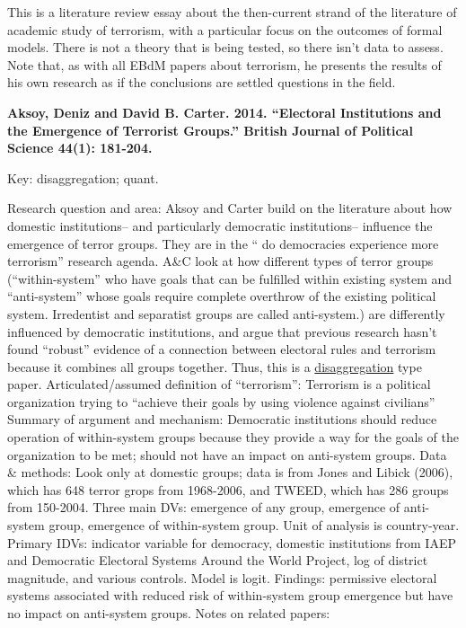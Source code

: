 \documentclass{article}[12pt]
\begin{document}
This is a literature review essay about the then-current strand of the literature of academic study of terrorism, with a particular focus on the outcomes of formal models.  There is not a theory that is being tested, so there isn't data to assess. Note that, as with all EBdM papers about terrorism, he presents the results of his own research as if the conclusions are settled questions in the field.

\textbf{Aksoy, Deniz and David B. Carter. 2014. “Electoral Institutions and the Emergence of Terrorist Groups.” British Journal of Political Science 44(1): 181-204.}

Key: disaggregation; quant.

Research question and area: Aksoy and Carter build on the literature about how domestic institutions-- and particularly democratic institutions-- influence the emergence of terror groups. They are in the `` do democracies experience more terrorism'' research agenda. A\&C look at how different types of terror groups (``within-system'' who have goals that can be fulfilled within existing system and ``anti-system'' whose goals require complete overthrow of the existing political system. Irredentist and separatist groups are called anti-system.) are differently influenced by democratic institutions, and argue that previous research hasn't found ``robust'' evidence of a connection between electoral rules and terrorism because it combines all groups together. Thus, this is a \underline{disaggregation} type paper.
Articulated/assumed definition of ``terrorism'': Terrorism is a political organization trying to ``achieve their goals by using violence against civilians''
Summary of argument and mechanism: Democratic institutions should reduce operation of within-system groups because they provide a way for the goals of the organization to be met; should not have an impact on anti-system groups.
Data \& methods: Look only at domestic groups; data is from Jones and Libick (2006), which has 648 terror grops from 1968-2006, and TWEED, which has 286 groups from 150-2004. Three main DVs: emergence of any group, emergence of anti-system group, emergence of within-system group. Unit of analysis is country-year. Primary IDVs: indicator variable for democracy, domestic institutions from IAEP and Democratic Electoral Systems Around the World Project, log of district magnitude, and various controls. Model is logit.
Findings: permissive electoral systems associated with reduced risk of within-system group emergence but have no impact on anti-system groups. 
Notes on related papers:
\end{document}
